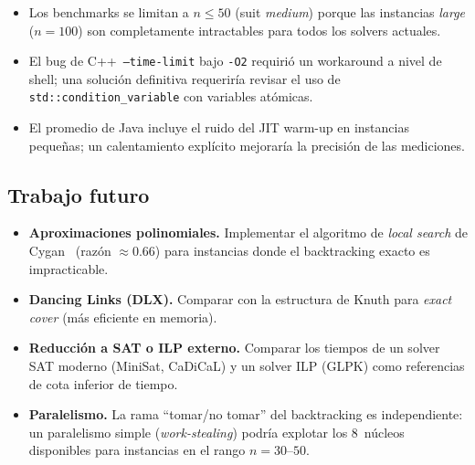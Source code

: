 \begin{itemize}
  \item Los benchmarks se limitan a $n\le 50$ (suit \textit{medium}) porque
        las instancias \textit{large} ($n=100$) son completamente intractables
        para todos los solvers actuales.
  \item El bug de C++~\texttt{--time-limit} bajo \texttt{-O2} requirió un
        workaround a nivel de shell; una solución definitiva requeriría
        revisar el uso de \texttt{std::condition\_variable} con variables
        atómicas.
  \item El promedio de Java incluye el ruido del JIT warm-up en instancias
        pequeñas; un calentamiento explícito mejoraría la precisión de las
        mediciones.
\end{itemize}

\subsection{Trabajo futuro}
\label{sec:conc:futuro}

\begin{itemize}
  \item \textbf{Aproximaciones polinomiales.}
        Implementar el algoritmo de \textit{local search} de Cygan~\cite{cygan2015}
        (razón $\approx 0.66$) para instancias donde el backtracking exacto
        es impracticable.
  \item \textbf{Dancing Links (DLX).}
        Comparar con la estructura de Knuth para \textit{exact cover}
        (m\'as eficiente en memoria).
  \item \textbf{Reducción a SAT o ILP externo.}
        Comparar los tiempos de un solver SAT moderno (MiniSat, CaDiCaL) y
        un solver ILP (GLPK) como referencias de cota inferior de tiempo.
  \item \textbf{Paralelismo.}
        La rama ``tomar/no tomar'' del backtracking es independiente: un
        paralelismo simple (\textit{work-stealing}) podría explotar los 8~núcleos
        disponibles para instancias en el rango $n=30$--$50$.
\end{itemize}
